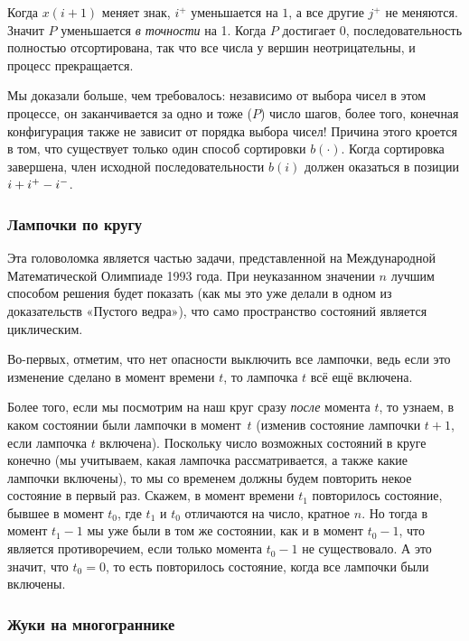 Когда $x(i+1)$ меняет знак, $i^+$ уменьшается на $1$, а все другие $j^+$ не меняются.
Значит $P$ уменьшается \emph{в точности} на 1.
Когда $P$ достигает $0$, последовательность полностью отсортирована, так что все числа у вершин неотрицательны, и процесс прекращается.

Мы доказали больше, чем требовалось:
независимо от выбора чисел в этом процессе, он заканчивается за одно и тоже ($P$) число шагов,
более того, конечная конфигурация также не зависит от порядка выбора чисел!
Причина этого кроется в том, что существует только один способ сортировки $b(\cdot)$.
Когда сортировка завершена, член исходной последовательности $b(i)$ должен оказаться в позиции $i \z+ i^+ - i^-$.
\heart

\subsubsection*{Лампочки по кругу}%

Эта головоломка является частью задачи, представленной на Международной Математической Олимпиаде 1993 года.
При неуказанном значении $n$ лучшим способом решения будет показать (как мы это уже делали в одном из доказательств «Пустого ведра»), что само пространство состояний является циклическим.

\medskip

Во-первых, отметим, что нет опасности выключить все лампочки,
ведь если это изменение сделано в момент времени $t$, то лампочка $t$ всё ещё включена.

Более того, если мы посмотрим на наш круг сразу \emph{после} момента $t$, то узнаем, в каком состоянии были лампочки в момент~$t$ (изменив состояние лампочки $t+1$, если лампочка $t$ включена).
Поскольку число возможных состояний в круге конечно (мы учитываем, какая лампочка рассматривается, а также какие лампочки включены), то мы со временем должны будем повторить некое состояние в первый раз.
Скажем, в момент времени $t_1$ повторилось состояние, бывшее в момент $t_0$, где $t_1$ и $t_0$ отличаются на число, кратное $n$.
Но тогда в момент $t_1 - 1$ мы уже были в том же состоянии, как и в момент $t_0 - 1$, что является противоречием, если только момента $t_0 - 1$ не существовало.
А это значит, что $t_0=0$, то есть повторилось состояние, когда все лампочки были включены.
\heart

\subsubsection*{Жуки на многограннике}%

